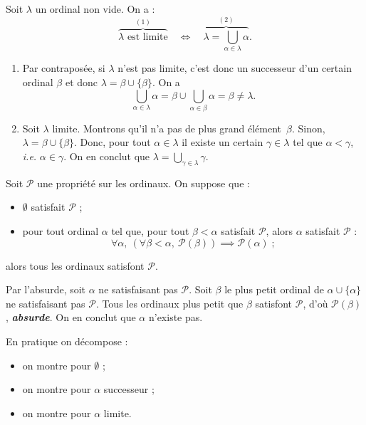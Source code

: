 \documentclass[./main]{subfiles}
\begin{document}
  \begin{prop}
    Soit $\lambda$ un ordinal non vide. On a :
    \[
      \overbrace{\lambda \text{ est limite}}^{(1)} \quad \iff \quad \overbrace{\lambda = \bigcup_{\alpha \in \lambda} \alpha}^{(2)}
    .\] 
  \end{prop}
  \begin{prv}
    \begin{enumerate}
      \item Par contraposée, si $\lambda$ n'est pas limite, c'est donc un successeur d'un certain ordinal $\beta$ et donc $\lambda = \beta \cup \{\beta\}$.
        On a \[
        \bigcup_{\alpha \in \lambda} \alpha = \beta \cup \bigcup_{\alpha \in \beta} \alpha = \beta \neq \lambda
        .\] 
      \item Soit $\lambda$ limite.
        Montrons qu'il n'a pas de plus grand élément~$\beta$.
        Sinon, $\lambda = \beta \cup \{\beta\}$.
        Donc, pour tout $\alpha \in \lambda$ il existe un certain $\gamma \in \lambda$ tel que $\alpha < \gamma$,  \textit{i.e.} $\alpha \in \gamma$.
        On en conclut que $\lambda = \bigcup_{\gamma \in \lambda} \gamma$.
    \end{enumerate}
  \end{prv}

  \begin{thm}
    Soit $\mathcal{P}$ une propriété sur les ordinaux.
    On suppose que :
    \begin{itemize}
      \item $\emptyset$ satisfait $\mathcal{P}$ ;
      \item pour tout ordinal $\alpha$ tel que, pour tout $\beta < \alpha$ satisfait $\mathcal{P}$, alors $\alpha$ satisfait $\mathcal{P}$ :
        \[
        \forall \alpha, \: (\forall \beta < \alpha, \: \mathcal{P}(\beta)) \implies \mathcal{P}(\alpha) \;
        ;\] 
    \end{itemize}
    alors tous les ordinaux satisfont $\mathcal{P}$.
  \end{thm}
  \begin{prv}
    Par l'absurde, soit $\alpha$ ne satisfaisant pas $\mathcal{P}$.
    Soit $\beta$ le plus petit ordinal de $\alpha \cup \{\alpha\}$ ne satisfaisant pas $\mathcal{P}$.
    Tous les ordinaux plus petit que $\beta$ satisfont $\mathcal{P}$, d'où $\mathcal{P}(\beta)$, \textit{\textbf{absurde}}.
    On en conclut que $\alpha$ n'existe pas.
  \end{prv}

  \begin{rmk}
    En pratique on décompose :
    \begin{itemize}
      \item on montre pour $\emptyset$ ;
      \item on montre pour $\alpha$ successeur ;
      \item on montre pour $\alpha$ limite.
    \end{itemize}
  \end{rmk}
\end{document}

